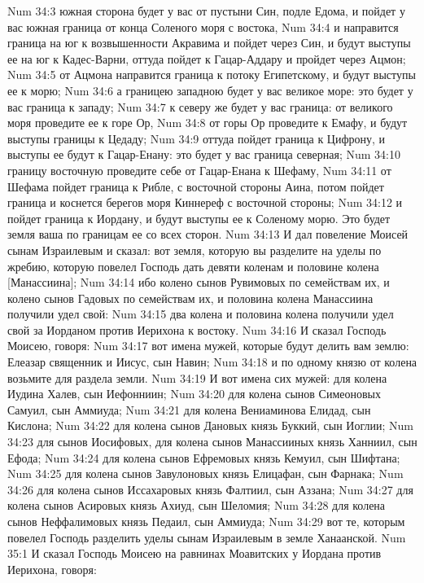 \vs Num 34:3 южная сторона будет у вас от пустыни Син, подле Едома, и пойдет у вас южная граница от конца Соленого моря с востока,
\vs Num 34:4 и направится граница на юг к возвышенности Акравима и пойдет через Син, и будут выступы ее на юг к Кадес-Варни, оттуда пойдет к Гацар-Аддару и пройдет через Ацмон;
\vs Num 34:5 от Ацмона направится граница к потоку Египетскому, и будут выступы ее к морю;
\vs Num 34:6 а границею западною будет у вас великое море: это будет у вас граница к западу;
\vs Num 34:7 к северу же будет у вас граница: от великого моря проведите ее к горе Ор,
\vs Num 34:8 от горы Ор проведите к Емафу, и будут выступы границы к Цедаду;
\vs Num 34:9 оттуда пойдет граница к Цифрону, и выступы ее будут к Гацар-Енану: это будет у вас граница северная;
\vs Num 34:10 границу восточную проведите себе от Гацар-Енана к Шефаму,
\vs Num 34:11 от Шефама пойдет граница к Рибле, с восточной стороны Аина, потом пойдет граница и коснется берегов моря Киннереф с восточной стороны;
\vs Num 34:12 и пойдет граница к Иордану, и будут выступы ее к Соленому морю. Это будет земля ваша по границам ее со всех сторон.
\vs Num 34:13 И дал повеление Моисей сынам Израилевым и сказал: вот земля, которую вы разделите на уделы по жребию, которую повелел Господь дать девяти коленам и половине колена [Манассиина];
\vs Num 34:14 ибо колено сынов Рувимовых по семействам их, и колено сынов Гадовых по семействам их, и половина колена Манассиина получили удел свой:
\vs Num 34:15 два колена и половина колена получили удел свой за Иорданом против Иерихона к востоку.
\rsbpar\vs Num 34:16 И сказал Господь Моисею, говоря:
\vs Num 34:17 вот имена мужей, которые будут делить вам землю: Елеазар священник и Иисус, сын Навин;
\vs Num 34:18 и по одному князю от колена возьмите для раздела земли.
\vs Num 34:19 И вот имена сих мужей: для колена Иудина Халев, сын Иефонниин;
\vs Num 34:20 для колена сынов Симеоновых Самуил, сын Аммиуда;
\vs Num 34:21 для колена Вениаминова Елидад, сын Кислона;
\vs Num 34:22 для колена сынов Дановых князь Буккий, сын Иоглии;
\vs Num 34:23 для сынов Иосифовых, для колена сынов Манассииных князь Ханниил, сын Ефода;
\vs Num 34:24 для колена сынов Ефремовых князь Кемуил, сын Шифтана;
\vs Num 34:25 для колена сынов Завулоновых князь Елицафан, сын Фарнака;
\vs Num 34:26 для колена сынов Иссахаровых князь Фалтиил, сын Аззана;
\vs Num 34:27 для колена сынов Асировых князь Ахиуд, сын Шеломия;
\vs Num 34:28 для колена сынов Неффалимовых князь Педаил, сын Аммиуда;
\vs Num 34:29 вот те, которым повелел Господь разделить уделы сынам Израилевым в земле Ханаанской.
\vs Num 35:1 И сказал Господь Моисею на равнинах Моавитских у Иордана против Иерихона, говоря:
